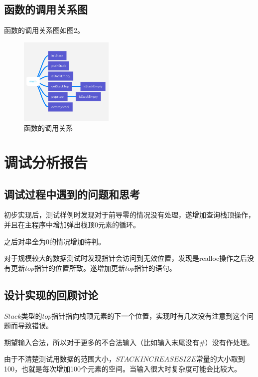 \documentclass{article}
\begin{document}
\subsection{函数的调用关系图}

函数的调用关系图如图2。

\begin{figure}[htbp]
    
    \centering\includegraphics[width=0.4\textwidth]{./Images/pic2_2.png}
    
    \caption{函数的调用关系}
    
\end{figure}

\section{调试分析报告}

\subsection{调试过程中遇到的问题和思考}

初步实现后，测试样例时发现对于前导零的情况没有处理，遂增加查询栈顶操作，并且在主程序中增加弹出栈顶0元素的循环。

之后对串全为0的情况增加特判。

对于规模较大的数据测试时发现指针会访问到无效位置，发现是realloc操作之后没有更新$top$指针的位置所致。遂增加更新$top$指针的语句。

\subsection{设计实现的回顾讨论}

$Stack$类型的$top$指针指向栈顶元素的下一个位置，实现时有几次没有注意到这个问题而导致错误。

期望输入合法，所以对于更多的不合法输入（比如输入末尾没有\#）没有作处理。

由于不清楚测试用数据的范围大小，$STACKINCREASESIZE$常量的大小取到100，也就是每次增加100个元素的空间。当输入很大时复杂度可能会比较大。
\end{document}
